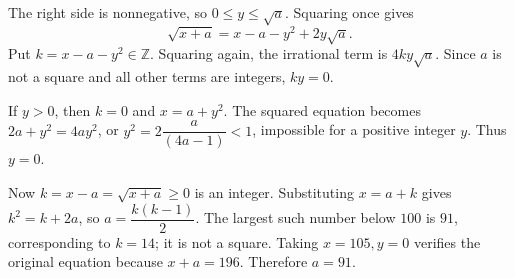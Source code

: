 The right side is nonnegative, so $0\le y\le\sqrt a$. Squaring once gives
\[
\sqrt{x+a}=x-a-y^2+2y\sqrt a.
\]
Put $k=x-a-y^2\in\mathbb Z$. Squaring again, the irrational term is $4ky\sqrt a$. Since $a$ is not a square and all other terms are integers, $ky=0$.

If $y>0$, then $k=0$ and $x=a+y^2$. The squared equation becomes $2a+y^2=4ay^2$, or $y^2=2\dfrac{a}{(4a-1)}<1$, impossible for a positive integer $y$. Thus $y=0$.

Now $k=x-a=\sqrt{x+a}\ge0$ is an integer. Substituting $x=a+k$ gives $k^2=k+2a$, so $a=\dfrac{k(k-1)}{2}$. The largest such number below $100$ is $91$, corresponding to $k=14$; it is not a square. Taking $x=105,y=0$ verifies the original equation because $x+a=196$. Therefore $\boxed{a=91}$.

